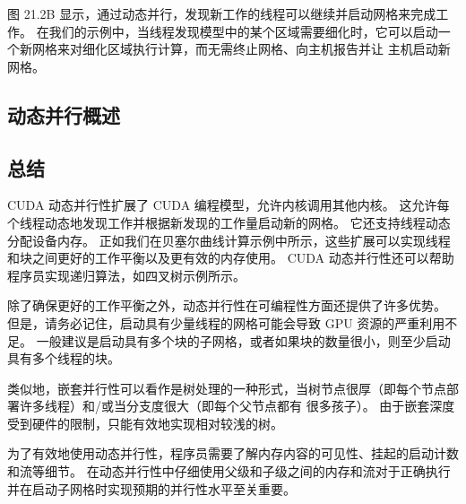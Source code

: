 图 21.2B 显示，通过动态并行，发现新工作的线程可以继续并启动网格来完成工作。 在我们的示例中，当线程发现模型中的某个区域需要细化时，它可以启动一个新网格来对细化区域执行计算，而无需终止网格、向主机报告并让 主机启动新网格。

\subsection{动态并行概述}

\subsection{总结}
CUDA 动态并行性扩展了 CUDA 编程模型，允许内核调用其他内核。 这允许每个线程动态地发现工作并根据新发现的工作量启动新的网格。 它还支持线程动态分配设备内存。 正如我们在贝塞尔曲线计算示例中所示，这些扩展可以实现线程和块之间更好的工作平衡以及更有效的内存使用。 CUDA 动态并行性还可以帮助程序员实现递归算法，如四叉树示例所示。

除了确保更好的工作平衡之外，动态并行性在可编程性方面还提供了许多优势。 但是，请务必记住，启动具有少量线程的网格可能会导致 GPU 资源的严重利用不足。 一般建议是启动具有多个块的子网格，或者如果块的数量很小，则至少启动具有多个线程的块。

类似地，嵌套并行性可以看作是树处理的一种形式，当树节点很厚（即每个节点部署许多线程）和/或当分支度很大（即每个父节点都有 很多孩子）。 由于嵌套深度受到硬件的限制，只能有效地实现相对较浅的树。

为了有效地使用动态并行性，程序员需要了解内存内容的可见性、挂起的启动计数和流等细节。 在动态并行性中仔细使用父级和子级之间的内存和流对于正确执行并在启动子网格时实现预期的并行性水平至关重要。